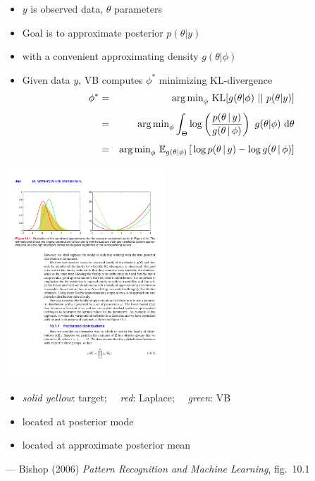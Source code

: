 \documentclass[10pt]{report}
\begin{document}
%
\begin{itemize}
\item $y$ is observed data, $\theta$ parameters
\item Goal is to approximate posterior $p(\theta | y)$
\item with a convenient approximating density $g(\theta | \phi)$
\item Given data $y$, VB computes $\phi^*$
minimizing KL-divergence
{\small
\begin{eqnarray*}
\phi^*
& = &
\displaystyle
\mbox{arg\,min}_{\phi} \ \mbox{KL}[g(\theta|\phi) \ || \ p(\theta|y)]
\\[4pt]
& = &
\displaystyle
\mbox{arg\,min}_{\phi}
\int_{\Theta}
  \log\left(
    \frac{p(\theta \, | \, y)}{g(\theta \, | \, \phi)}
  \right)
  \ g(\theta | \phi) \ \mathrm{d}\theta
\\[4pt]
& = &
\mbox{arg\,min}_{\phi} \
\mathbb{E}_{g(\theta|\phi)}\left[\,
  \log p(\theta \, | \, y) - \log g(\theta \, | \, \phi)
\right]
\end{eqnarray*}
}
\end{itemize}


%
\vspace*{-6pt}
\begin{center}
\includegraphics[width=0.45\textwidth]{img/bishop-fig-10-1.pdf}
\end{center}
\vspace*{-10pt}
\begin{itemize}
\item {\slshape solid yellow}: target; \ \ {\slshape red}: Laplace; \ \
  {\slshape green}: VB
\item \myemph{Laplace} located at posterior mode
\item \myemph{VB} located at approximate posterior mean
\end{itemize}
\vfill \hfill
{\footnotesize  --- Bishop (2006) {\slshape Pattern Recognition and Machine Learning}, fig.~10.1}
\end{document}
